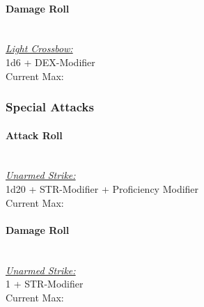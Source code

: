 \documentclass[letterpaper,openany,oneside,twocolumn]{book}
\begin{document}
\paragraph*{Damage Roll}\hfill\\
\underline{\textit{Light Crossbow:}}\\
1d6 + DEX-Modifier\\
\indent Current Max: 
\subsubsection*{Special Attacks}
\paragraph*{Attack Roll}\hfill\\
\underline{\textit{Unarmed Strike:}}\\
1d20 + STR-Modifier + Proficiency Modifier\\
\indent Current Max: 
\paragraph*{Damage Roll}\hfill\\
\underline{\textit{Unarmed Strike:}}\\
1 + STR-Modifier\\
\indent Current Max: 
\end{document}
